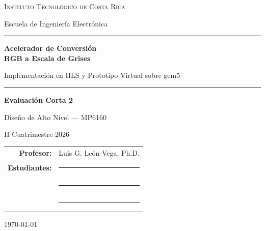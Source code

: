 \documentclass[11pt,letterpaper]{article}
\begin{document}

\begin{titlepage}
\centering
\vspace*{2cm}

{\large\scshape Instituto Tecnológico de Costa Rica\par}
\vspace{0.3cm}
{\large Escuela de Ingeniería Electrónica\par}
\vspace{2.5cm}

{\color{azulunc}\rule{\textwidth}{1.5pt}}
\vspace{0.6cm}

{\Huge\bfseries Acelerador de Conversión\\[0.2cm] RGB a Escala de Grises\par}
\vspace{0.5cm}
{\Large Implementación en HLS y Prototipo Virtual sobre gem5\par}

\vspace{0.6cm}
{\color{azulunc}\rule{\textwidth}{1.5pt}}

\vspace{2cm}

{\large\textbf{Evaluación Corta 2}\par}
\vspace{0.3cm}
{\large Diseño de Alto Nivel --- MP6160\par}
{\large II Cuatrimestre 2026\par}

\vspace{2cm}

\begin{tabular}{r l}
\textbf{Profesor:} & Luis G. León-Vega, Ph.D. \\[0.35cm]
\textbf{Estudiantes:} & \rule{6cm}{0.4pt} \\[0.35cm]
                      & \rule{6cm}{0.4pt} \\[0.35cm]
                      & \rule{6cm}{0.4pt} \\
\end{tabular}

\vfill
{\large \today\par}
\end{titlepage}

\tableofcontents
\newpage
\end{document}
